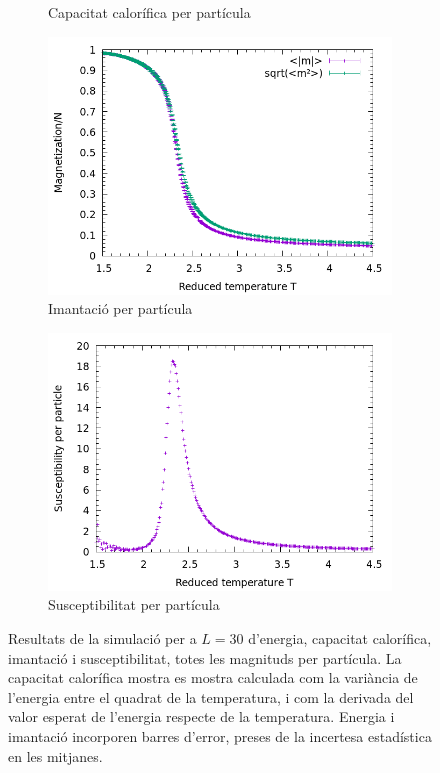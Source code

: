\documentclass[a4paper]{article}
\begin{document}
\begin{figure}[H]
\begin{subfigure}{.45\textwidth}
        \caption{Capacitat calorífica per partícula}
        \label{fig:props-cv}
    \end{subfigure}
        \begin{subfigure}{.45\textwidth}
        \centering
        \includegraphics[width=\textwidth]{props-L-030_m.png}
        \caption{Imantació per partícula}
        \label{fig:props-m}
    \end{subfigure}
    \begin{subfigure}{.45\textwidth}
        \centering
        \includegraphics[width=\textwidth]{props-L-030_xn.png}
        \caption{Susceptibilitat per partícula}
        \label{fig:props-x}
    \end{subfigure}
    \caption{Resultats de la simulació per a $L=30$ d'energia, capacitat calorífica, imantació i susceptibilitat, totes les magnituds per partícula. La capacitat calorífica mostra es mostra calculada com la variància de l'energia entre el quadrat de la temperatura, i com la derivada del valor esperat de l'energia respecte de la temperatura. Energia i imantació incorporen barres d'error, preses de la incertesa estadística en les mitjanes.}
\label{fig:props}
\end{figure}
\end{document}
